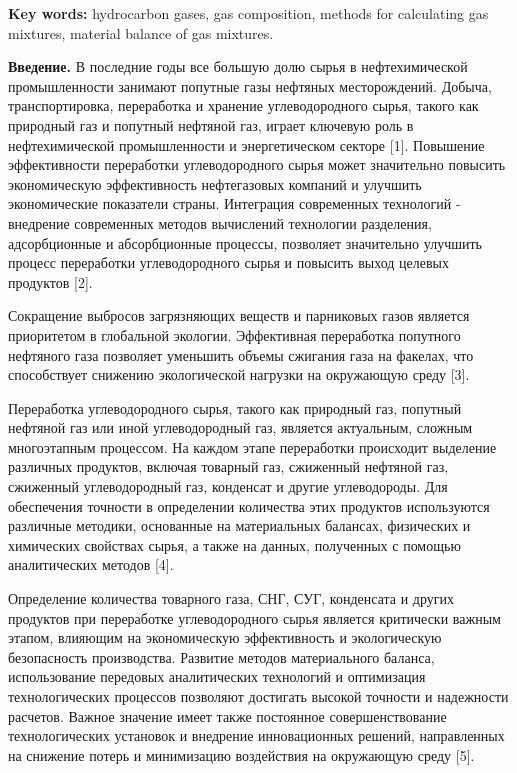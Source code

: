 {\bfseries Key words:} hydrocarbon gases, gas composition, methods for
calculating gas mixtures, material balance of gas mixtures.

\begin{multicols}{2}
{\bfseries Введение.} В последние годы все большую долю сырья в
нефтехимической промышленности занимают попутные газы нефтяных
месторождений. Добыча, транспортировка, переработка и хранение
углеводородного сырья, такого как природный газ и попутный нефтяной газ,
играет ключевую роль в нефтехимической промышленности и энергетическом
секторе {[}1{]}. Повышение эффективности переработки углеводородного
сырья может значительно повысить экономическую эффективность
нефтегазовых компаний и улучшить экономические показатели страны.
Интеграция современных технологий - внедрение современных методов
вычислений технологии разделения, адсорбционные и абсорбционные
процессы, позволяет значительно улучшить процесс переработки
углеводородного сырья и повысить выход целевых продуктов {[}2{]}.

Сокращение выбросов загрязняющих веществ и парниковых газов является
приоритетом в глобальной экологии. Эффективная переработка попутного
нефтяного газа позволяет уменьшить объемы сжигания газа на факелах, что
способствует снижению экологической нагрузки на окружающую среду
{[}3{]}.

Переработка углеводородного сырья, такого как природный газ, попутный
нефтяной газ или иной углеводородный газ, является актуальным, сложным
многоэтапным процессом. На каждом этапе переработки происходит выделение
различных продуктов, включая товарный газ, сжиженный нефтяной газ,
сжиженный углеводородный газ, конденсат и другие углеводороды. Для
обеспечения точности в определении количества этих продуктов
используются различные методики, основанные на материальных балансах,
физических и химических свойствах сырья, а также на данных, полученных с
помощью аналитических методов {[}4{]}.

Определение количества товарного газа, СНГ, СУГ, конденсата и других
продуктов при переработке углеводородного сырья является критически
важным этапом, влияющим на экономическую эффективность и экологическую
безопасность производства. Развитие методов материального баланса,
использование передовых аналитических технологий и оптимизация
технологических процессов позволяют достигать высокой точности и
надежности расчетов. Важное значение имеет также постоянное
совершенствование технологических установок и внедрение инновационных
решений, направленных на снижение потерь и минимизацию воздействия на
окружающую среду {[}5{]}.


\end{multicols}
